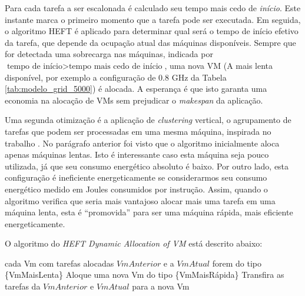 Para cada tarefa a ser escalonada é calculado seu tempo mais cedo de
\emph{início}. Este instante marca o primeiro momento que a tarefa pode ser
executada. Em seguida, o algoritmo HEFT é aplicado para determinar qual será o
tempo de início efetivo da tarefa, que depende da ocupação atual das máquinas
disponíveis. Sempre que for detectada uma sobrecarga nas máquinas, indicada por
$\text{tempo de início} > \text{tempo mais cedo de início}$, uma nova VM (A
mais lenta disponível, por exemplo a configuração de 0.8 GHz da Tabela
\ref{tab:modelo_grid_5000}) é alocada. A esperança é que isto garanta uma
economia na alocação de VMs sem prejudicar o \emph{makespan} da aplicação.

Uma segunda otimização é a aplicação de \emph{clustering} vertical, o
agrupamento de tarefas que podem ser processadas em uma mesma máquina, inspirada
no trabalho \cite{chen:workflowsim}. No parágrafo anterior foi visto que o
algoritmo inicialmente aloca apenas máquinas lentas. Isto é interessante caso
esta máquina seja pouco utilizada, já que seu consumo energético absoluto é
baixo. Por outro lado, esta configuração é ineficiente energeticamente se
considerarmos seu consumo energético medido em Joules consumidos por instrução.
Assim, quando o algoritmo verifica que seria mais vantajoso alocar mais uma
tarefa em uma máquina lenta, esta é ``promovida'' para ser uma máquina rápida,
mais eficiente energeticamente.

O algoritmo do \emph{HEFT Dynamic Allocation of VM} está descrito abaixo:

\begin{codebox}
	\li \For cada Vm com tarefas alocadas
		\li \Do \If $VmAnterior$ e a $VmAtual$ forem do tipo \{VmMaisLenta\}
			\li \Do Aloque uma nova Vm do tipo \{VmMaisRápida\}
			\li Transfira as tarefas da $VmAnterior$ e $VmAtual$ para a nova Vm
		\End
	\End
\end{codebox}

